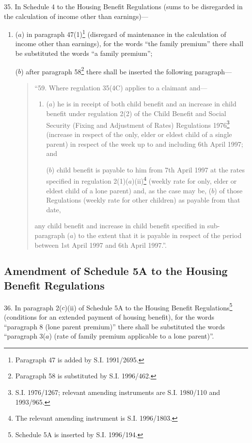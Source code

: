 \documentclass[a4paper]{article}
\begin{document}
35.  In Schedule 4 to the Housing Benefit Regulations (sums to be disregarded in the calculation of income other than earnings)—
\begin{enumerate}\item[]
($a$) in paragraph 47(1)\footnote{\frenchspacing Paragraph 47 is added by S.I. 1991/2695.} (disregard of maintenance in the calculation of income other than earnings), for the words “the family premium” there shall be substituted the words “a family premium”;

($b$) after paragraph 58\footnote{\frenchspacing Paragraph 58 is substituted by S.I. 1996/462.} there shall be inserted the following paragraph—
\begin{quotation}
“59.  Where regulation 35(4C) applies to a claimant and—
\begin{enumerate}\item[]
($a$) he is in receipt of both child benefit and an increase in child benefit under regulation 2(2) of the Child Benefit and Social Security (Fixing and Adjustment of Rates) Regulations 1976\footnote{\frenchspacing S.I. 1976/1267; relevant amending instruments are S.I. 1980/110 and 1993/965.} (increase in respect of the only, elder or eldest child of a single parent) in respect of the week up to and including 6th April 1997; and

($b$) child benefit is payable to him from 7th April 1997 at the rates specified in regulation 2(1)($a$)(ii)\footnote{\frenchspacing The relevant amending instrument is S.I. 1996/1803.} (weekly rate for only, elder or eldest child of a lone parent) and, as the case may be, ($b$) of those Regulations (weekly rate for other children) as payable from that date,
\end{enumerate}
any child benefit and increase in child benefit specified in sub-paragraph ($a$) to the extent that it is payable in respect of the period between 1st April 1997 and 6th April 1997.”.
\end{quotation}
\end{enumerate}

\subsection[36. Amendment of Schedule 5A to the Housing Benefit Regulations]{Amendment of Schedule 5A to the Housing Benefit Regulations}

36.  In paragraph 2($c$)(ii) of Schedule 5A to the Housing Benefit Regulations\footnote{\frenchspacing Schedule 5A is inserted by S.I. 1996/194.} (conditions for an extended payment of housing benefit), for the words “paragraph 8 (lone parent premium)” there shall be substituted the words “paragraph 3($a$) (rate of family premium applicable to a lone parent)”.
\end{document}
